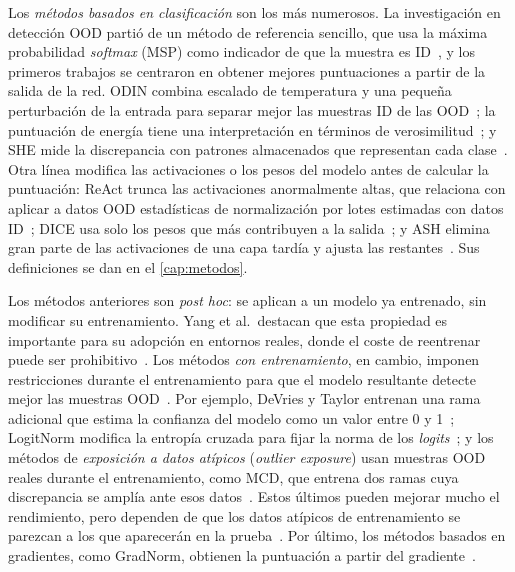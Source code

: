 Los \emph{métodos basados en clasificación} son los más numerosos. La
investigación en detección OOD partió de un método de referencia sencillo, que usa
la máxima probabilidad \emph{softmax} (MSP) como indicador de que la muestra es
ID~\cite{yang2024,hendrycks2017}, y los primeros trabajos se centraron en obtener
mejores puntuaciones a partir de la salida de la red. ODIN combina escalado de
temperatura y una pequeña perturbación de la entrada para separar mejor las
muestras ID de las OOD~\cite{yang2024,liang2018}; la puntuación de energía tiene
una interpretación en términos de verosimilitud~\cite{yang2024,liu2020energy}; y
SHE mide la discrepancia con patrones almacenados que representan cada
clase~\cite{yang2024,zhang2023she}. Otra línea modifica las activaciones o los
pesos del modelo antes de calcular la puntuación: ReAct trunca las activaciones
anormalmente altas, que relaciona con aplicar a datos OOD estadísticas de
normalización por lotes estimadas con datos ID~\cite{yang2024,sun2021react};
DICE usa solo los pesos que más contribuyen a la salida~\cite{yang2024,sun2022dice};
y ASH elimina gran parte de las activaciones de una capa tardía y ajusta las
restantes~\cite{yang2024,djurisic2023}. Sus definiciones se dan en el
\cref{cap:metodos}.

Los métodos anteriores son \emph{post hoc}: se aplican a un modelo ya entrenado,
sin modificar su entrenamiento. Yang et al.\ destacan que esta propiedad es
importante para su adopción en entornos reales, donde el coste de reentrenar
puede ser prohibitivo~\cite{yang2024,sevillano2026}. Los métodos \emph{con
entrenamiento}, en cambio, imponen restricciones durante el entrenamiento para que
el modelo resultante detecte mejor las muestras OOD~\cite{sevillano2026}. Por
ejemplo, DeVries y Taylor entrenan una rama adicional que estima la confianza del
modelo como un valor entre 0 y 1~\cite{sevillano2026,yang2024}; LogitNorm
modifica la entropía cruzada para fijar la norma de los
\emph{logits}~\cite{yang2024}; y los métodos de \emph{exposición a datos
atípicos} (\emph{outlier exposure}) usan muestras OOD reales durante el
entrenamiento, como MCD, que entrena dos ramas cuya discrepancia se amplía ante
esos datos~\cite{yang2024,yu2019unsupervised}. Estos últimos pueden mejorar
mucho el rendimiento, pero dependen de que los datos atípicos de entrenamiento se
parezcan a los que aparecerán en la prueba~\cite{yang2024}. Por último, los
métodos basados en gradientes, como GradNorm, obtienen la puntuación a partir del
gradiente~\cite{yang2024,huang2021}.

